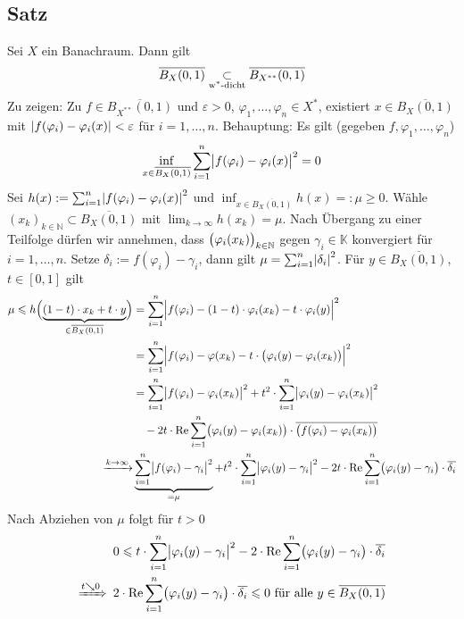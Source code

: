 \subsection[Satz: Die Einheitskugel eines Banachraumes $X$ liegt $\w^*$-dicht in der Einheitskugel von $X^{**}$]{Satz} %
\label{sub:516}
Sei $X$ ein Banachraum. Dann gilt 
\[
	\overline{B_X(0,1)} \underset{\text{$\w^*$-dicht}}{\subset} \overline{B_{X^{**}}(0,1)}  
\]
Zu zeigen: Zu $f \in \overline{B_{X^{**}}(0,1)}$ und $\varepsilon>0$, $\varphi_1, \ldots , \varphi_n \in X^*$, existiert $x \in \overline{B_X(0,1)}$ mit
$\abs*{f(\varphi_i)- \varphi_i(x)} < \varepsilon$ für $i=1,\ldots ,n$. Behauptung: Es gilt (gegeben $f,\varphi_1, \ldots , \varphi_n$)
\[
	\inf_{x \in \overline{B_X(0,1)} } \sum_{i=1}^{n} \abs[\big]{f(\varphi_i)- \varphi_i(x)}^2 = 0
\]
Sei $h(x) := \sum_{i=1}^{n} \abs*{f(\varphi_i)- \varphi_i(x)}^2 $ und $\inf_{x\in \overline{B_X(0,1)}} h(x) =: \mu \ge 0$. Wähle 
$(x_k)_{k \in \mathds{N}} \subset \overline{B_X(0,1)}$ mit $\lim_{k \to \infty} h(x_k)= \mu$. Nach Übergang zu einer Teilfolge dürfen wir annehmen, dass 
$\enbrace[\big]{\varphi_i(x_k)}_{k \in \mathds{N}}$ gegen  $\gamma_i \in \mathds{K}$ konvergiert für $i=1,\ldots ,n$. Setze $\delta_i := f(\varphi_i) -\gamma_i$, dann
gilt $\mu = \sum_{i=1}^{n} \abs*{\delta_i}^2$. Für $y \in \overline{B_X(0,1)}$, $t \in [0,1]$ gilt 
\begin{align*}
	\mu \le h\enbrace[\Big]{\underbrace{(1-t) \cdot x_k + t \cdot y}_{\in \overline{B_X(0,1)}}} &= 
	\sum_{i=1}^{n} \abs[\Big]{f(\varphi_i)- (1-t) \cdot \varphi_i(x_k) - t \cdot \varphi_i(y)}^2 \\
	&= \sum_{i=1}^{n} \abs[\Big]{f(\varphi_i)- \varphi(x_k) - t \cdot  \enbrace[\big]{\varphi_i(y)- \varphi_i(x_k)} }^2 \\
	&= \sum_{i=1}^{n} \abs[\big]{f(\varphi_i)- \varphi_i(x_k)}^2 + t^2 \cdot \sum_{i=1}^{n} \abs[\big]{\varphi_i(y)- \varphi_i(x_k)}^2 \\
	& \quad - 2 t \cdot \re \sum_{i=1}^{n} \enbrace[\big]{\varphi_i(y)- \varphi_i(x_k)} \cdot \overline{\enbrace[\big]{f(\varphi_i)- \varphi_i(x_k)} } \\
	\xrightarrow{k \to \infty} &\underbrace{\sum_{i=1}^{n} \abs[\big]{f(\varphi_i)- \gamma_i}^2}_{=\mu} + t^2 \cdot \sum_{i=1}^{n} \abs[\big]{\varphi_i(y)- \gamma_i}^2  
	-2 t \cdot \re \sum_{i=1}^{n} \enbrace[\big]{\varphi_i(y)- \gamma_i} \cdot \overline{\delta_i }
\end{align*}
Nach Abziehen von $\mu$ folgt für $t >0$
\begin{align*}
	&0 \le t \cdot \sum_{i=1}^{n} \abs[\big]{\varphi_i(y)- \gamma_i}^2 - 2 \cdot \re \sum_{i=1}^{n} \enbrace[\big]{\varphi_i(y)- \gamma_i} \cdot \overline{\delta_i}  \\
	\xRightarrow{t \searrow 0} \enspace & 2 \cdot \re \sum_{i=1}^{n} \enbrace[\big]{\varphi_i(y)- \gamma_i} \cdot \overline{\delta_i} \le 0 \text{ für alle } y \in \overline{B_X(0,1) }
\end{align*}
